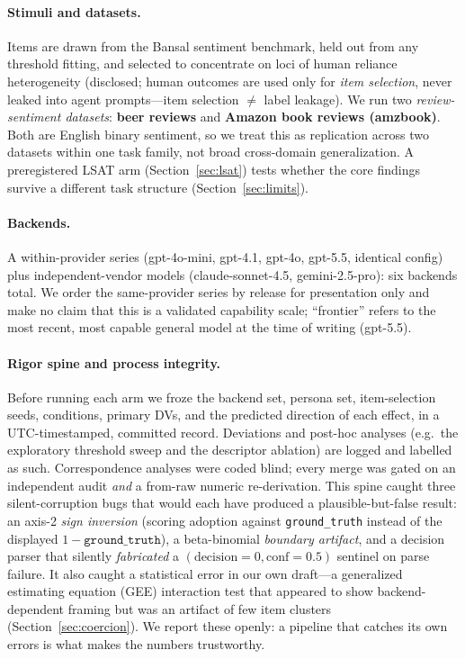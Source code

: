 \documentclass[manuscript,nonacm]{acmart}
\begin{document}
\paragraph{Stimuli and datasets.} Items are drawn from the Bansal sentiment benchmark, held out from any
threshold fitting, and selected to concentrate on loci of human reliance heterogeneity (disclosed; human
outcomes are used only for \emph{item selection}, never leaked into agent prompts---item selection $\ne$
label leakage). We run two \emph{review-sentiment datasets}: \textbf{beer reviews} and \textbf{Amazon book
reviews (amzbook)}. Both are English binary sentiment, so we treat this as replication across two
datasets within one task family, not broad cross-domain generalization. A preregistered LSAT arm
(Section~\ref{sec:lsat}) tests whether the core findings survive a different task structure
(Section~\ref{sec:limits}).

\paragraph{Backends.} A within-provider series (gpt-4o-mini, gpt-4.1, gpt-4o, gpt-5.5, identical config)
plus independent-vendor models (claude-sonnet-4.5, gemini-2.5-pro): six backends total. We order the
same-provider series by release for presentation only and make no claim that this is a validated capability
scale; ``frontier'' refers to the most recent, most capable general model at the time of writing (gpt-5.5).

\paragraph{Rigor spine and process integrity.} Before running each arm we froze the backend set, persona
set, item-selection seeds, conditions, primary DVs, and the predicted direction of each effect, in a
UTC-timestamped, committed record. Deviations and post-hoc analyses (e.g.\ the exploratory threshold sweep
and the descriptor ablation) are logged and labelled as such. Correspondence analyses were coded blind;
every merge was gated on an independent audit \emph{and} a from-raw numeric re-derivation. This spine caught
three silent-corruption bugs that would each have produced a plausible-but-false result: an axis-2
\emph{sign inversion} (scoring adoption against \texttt{ground\_truth} instead of the displayed
$1-\texttt{ground\_truth}$), a beta-binomial \emph{boundary artifact}, and a decision parser that silently
\emph{fabricated} a $(\text{decision}{=}0,\text{conf}{=}0.5)$ sentinel on parse failure. It also caught a
statistical error in our own draft---a generalized estimating equation (GEE) interaction test that appeared to show backend-dependent framing
but was an artifact of few item clusters (Section~\ref{sec:coercion}). We report these openly: a pipeline
that catches its own errors is what makes the numbers trustworthy.
\end{document}
